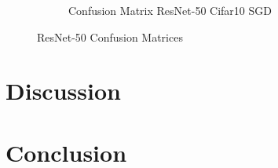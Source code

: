 \documentclass[conference]{IEEEtran}
\begin{document}
\begin{figure}[!htbp]
\begin{subfigure}[b]{0.22\textwidth}
        \caption{Confusion Matrix ResNet-50 Cifar10 SGD}
        \label{fig:x matrix_ResNet_CIFAR_SGD}
    \end{subfigure}
    \caption{ResNet-50 Confusion Matrices}
    \label{fig:ResNet Confusion Matrixis}
\end{figure}

\section{Discussion}\label{C5}

\section{Conclusion}\label{C6}

\printbibliography
\end{document}
